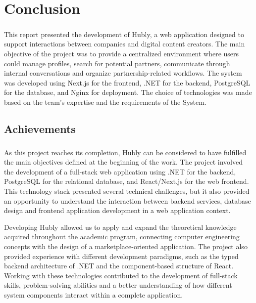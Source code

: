 \chapter{Conclusion}\label{ch:conclusion}

\paragraph{}This report presented the development of Hubly, a web application designed to support interactions between companies and digital content creators. The main objective of the project was to provide a centralized environment where users could manage profiles, search for potential partners, communicate through internal conversations and organize partnership-related workflows.
The system was developed using Next.js for the frontend, .NET for the backend, PostgreSQL for the database, and Nginx for deployment.
The choice of technologies was made based on the team’s expertise and the requirements of the System.

\section{Achievements}
\paragraph{}As this project reaches its completion, Hubly can be considered to have fulfilled the main objectives defined at the beginning of the work. The project involved the development of a full-stack web application using .NET for the backend, PostgreSQL for the relational database, and React/Next.js for the web frontend. This technology stack presented several technical challenges, but it also provided an opportunity to understand the interaction between backend services, database design and frontend application development in a web application context.

Developing Hubly allowed us to apply and expand the theoretical knowledge acquired throughout the academic program, connecting computer engineering concepts with the design of a marketplace-oriented application. The project also provided experience with different development paradigms, such as the typed backend architecture of .NET and the component-based structure of React. Working with these technologies contributed to the development of full-stack skills, problem-solving abilities and a better understanding of how different system components interact within a complete application.


